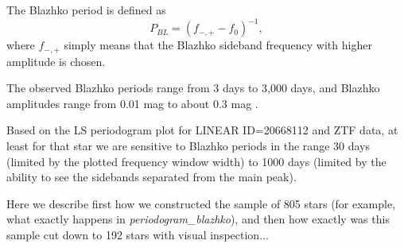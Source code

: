 The Blazhko period is defined as
\begin{equation}
  P_{BL} = (f_{-,+} - f_0)^{-1},
\end{equation}
where $f_{-,+}$ simply means that the Blazhko sideband frequency with higher amplitude is chosen. 

The observed Blazhko periods range from 3 days to 3,000 days, and Blazhko amplitudes range from 0.01 mag to about 0.3 mag \citep{2007MNRAS.377.1263S}.


%

Based on the LS periodogram plot for LINEAR ID=20668112 and ZTF data, at least for that star we are
sensitive to Blazhko periods in the range 30 days (limited by the plotted frequency window width) to
1000 days (limited by the ability to see the sidebands separated from the main peak). 


Here we describe first how we constructed the sample of 805 stars (for example, what exactly happens in
{\it periodogram\_blazhko}), and then how exactly was this sample cut down to 192 stars with visual inspection... 